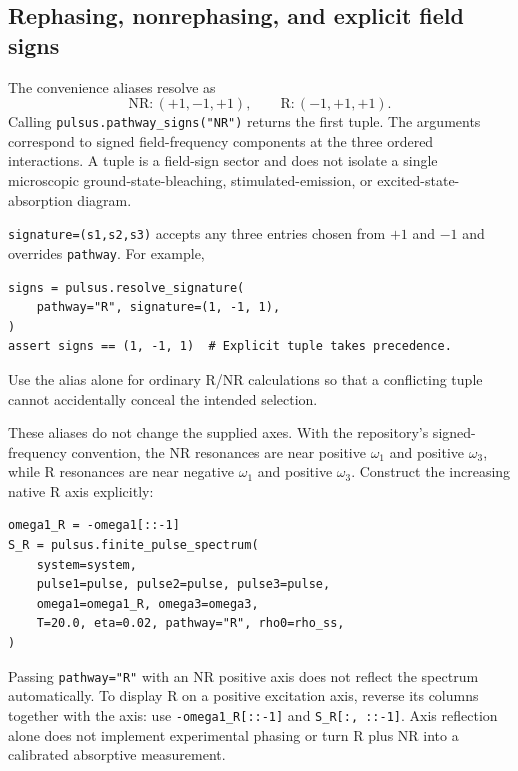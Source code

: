 \subsection{Rephasing, nonrephasing, and explicit field signs}

The convenience aliases resolve as
\begin{equation}
 \mathrm{NR}: (+1,-1,+1),\qquad
 \mathrm{R}: (-1,+1,+1).
\end{equation}
Calling \texttt{pulsus.pathway\_signs("NR")} returns the first tuple.
The arguments correspond to signed field-frequency components at the
three ordered interactions. A tuple is a field-sign sector and does not
isolate a single microscopic ground-state-bleaching, stimulated-emission,
or excited-state-absorption diagram.

\texttt{signature=(s1,s2,s3)} accepts any three entries chosen from
$+1$ and $-1$ and overrides \texttt{pathway}. For example,
\par\noindent
\begin{minipage}{\linewidth}
\begin{lstlisting}[style=python]
signs = pulsus.resolve_signature(
    pathway="R", signature=(1, -1, 1),
)
assert signs == (1, -1, 1)  # Explicit tuple takes precedence.
\end{lstlisting}
\end{minipage}\par
Use the alias alone for ordinary R/NR calculations so that a conflicting
tuple cannot accidentally conceal the intended selection.

These aliases do not change the supplied axes. With the repository's
signed-frequency convention, the NR resonances are near positive
$\omega_1$ and positive $\omega_3$, while R resonances are near negative
$\omega_1$ and positive $\omega_3$. Construct the increasing native R axis
explicitly:
\par\noindent
\begin{minipage}{\linewidth}
\begin{lstlisting}[style=python]
omega1_R = -omega1[::-1]
S_R = pulsus.finite_pulse_spectrum(
    system=system,
    pulse1=pulse, pulse2=pulse, pulse3=pulse,
    omega1=omega1_R, omega3=omega3,
    T=20.0, eta=0.02, pathway="R", rho0=rho_ss,
)
\end{lstlisting}
\end{minipage}\par
Passing \texttt{pathway="R"} with an NR positive axis does not reflect
the spectrum automatically. To display R on a positive excitation axis,
reverse its columns together with the axis: use
\texttt{-omega1\_R[::-1]} and \texttt{S\_R[:, ::-1]}.
Axis reflection alone does not implement experimental phasing or turn
R plus NR into a calibrated absorptive measurement.

